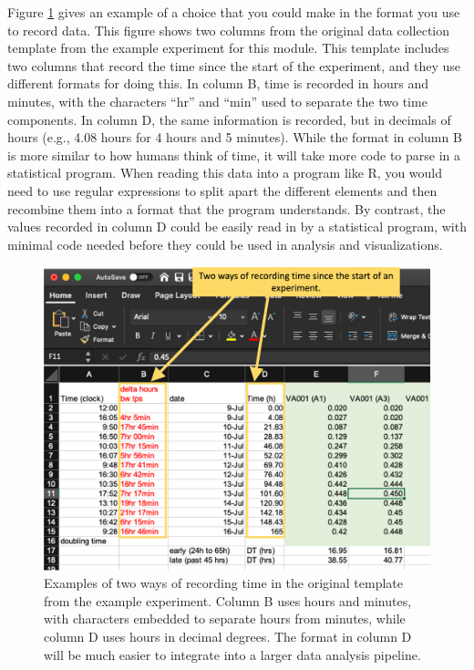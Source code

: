 \documentclass[]{tufte-book}
\begin{document}
Figure \ref{fig:recordingtime} gives an example of a choice that you could make
in the format you use to record data. This figure shows two columns from the
original data collection template from the example experiment for this module.
This template includes two columns that record the time since the start of the
experiment, and they use different formats for doing this. In column B, time is
recorded in hours and minutes, with the characters ``hr'' and ``min'' used to
separate the two time components. In column D, the same information is recorded,
but in decimals of hours (e.g., 4.08 hours for 4 hours and 5 minutes). While the
format in column B is more similar to how humans think of time, it will take
more code to parse in a statistical program. When reading this data into a
program like R, you would need to use regular expressions to split apart the
different elements and then recombine them into a format that the program
understands. By contrast, the values recorded in column D could be easily read
in by a statistical program, with minimal code needed before they could be used
in analysis and visualizations.

\begin{figure}
\includegraphics[width=\textwidth]{figures/growth_curve_recording_time} \caption[Examples of two ways of recording time in the original template from the example experiment]{Examples of two ways of recording time in the original template from the example experiment. Column B uses hours and minutes, with characters embedded to separate hours from minutes, while column D uses hours in decimal degrees. The format in column D will be much easier to integrate into a larger data analysis pipeline.}\label{fig:recordingtime}
\end{figure}
\end{document}
